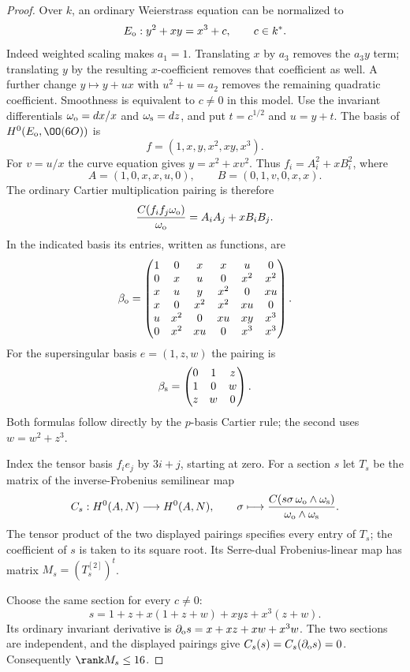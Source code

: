 \begin{proof}
Over $k$, an ordinary Weierstrass equation can be normalized to
\[
 E_{\rm o}:y^2+xy=x^3+c,\qquad c\in k^*.
\]
Indeed weighted scaling makes $a_1=1$. Translating $x$ by $a_3$
removes the $a_3y$ term; translating $y$ by the resulting
$x$-coefficient removes that coefficient as well. A further
change $y\mapsto y+u x$ with $u^2+u=a_2$ removes the remaining
quadratic coefficient.
Smoothness is equivalent to $c\ne0$ in this model.
Use the invariant differentials $\omega_{\rm o}=dx/x$ and
$\omega_{\rm s}=dz$, and put $t=c^{1/2}$ and $u=y+t$.
The basis of $H^0(E_{\rm o},\OO(6O))$ is
\[
                    f=(1,x,y,x^2,xy,x^3).
\]
For $v=u/x$ the curve equation gives $y=x^2+xv^2$.
Thus $f_i=A_i^2+xB_i^2$, where
\[
 A=(1,0,x,x,u,0),\qquad B=(0,1,v,0,x,x).
\]
The ordinary Cartier multiplication pairing is therefore
\[
 \frac{C(f_if_j\omega_{\rm o})}{\omega_{\rm o}}
                         =A_iA_j+xB_iB_j.
\]
In the indicated basis its entries, written as functions, are
\[
 \beta_{\rm o}=
 \begin{pmatrix}
 1&0&x&x&u&0\\
 0&x&u&0&x^2&x^2\\
 x&u&y&x^2&0&xu\\
 x&0&x^2&x^2&xu&0\\
 u&x^2&0&xu&xy&x^3\\
 0&x^2&xu&0&x^3&x^3
 \end{pmatrix}.
\]
For the supersingular basis $e=(1,z,w)$ the pairing is
\[
 \beta_{\rm s}=
 \begin{pmatrix}0&1&z\\1&0&w\\z&w&0\end{pmatrix}.
\]
Both formulas follow directly by the $p$-basis Cartier rule;
the second uses $w=w^2+z^3$.

Index the tensor basis $f_i e_j$ by $3i+j$, starting at zero.
For a section $s$ let $T_s$ be the matrix of the inverse-Frobenius
semilinear map
\[
 C_s:H^0(A,N)\longrightarrow H^0(A,N),\qquad
 \sigma\longmapsto
 \frac{C(s\sigma\,\omega_{\rm o}\wedge\omega_{\rm s})}
      {\omega_{\rm o}\wedge\omega_{\rm s}}.
\]
The tensor product of the two displayed pairings specifies every
entry of $T_s$; the coefficient of $s$ is taken to its square root.
Its Serre-dual Frobenius-linear map has matrix
$M_s=(T_s^{[2]})^t$.

Choose the same section for every $c\ne0$:
\[
 s=1+z+x(1+z+w)+xyz+x^3(z+w).
\]
Its ordinary invariant derivative is
$\partial_{
\rm o}s=x+xz+xw+x^3w$.
The two sections are independent, and the displayed pairings give
$C_s(s)=C_s(\partial_{\rm o}s)=0$.
Consequently $\rank M_s\le16$.


\end{proof}
